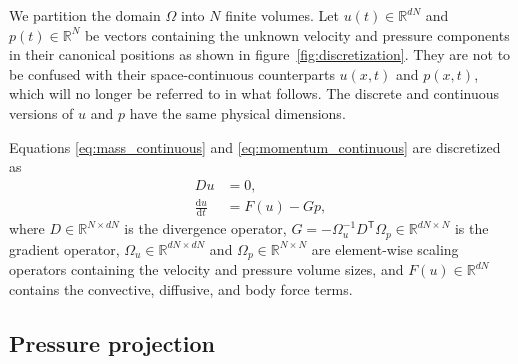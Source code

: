\documentclass[preprint]{elsarticle}
\begin{document}
We partition the domain $\Omega$ into $N$ finite volumes.
Let $u(t) \in \mathbb{R}^{d N}$ and $p(t) \in \mathbb{R}^N$ be vectors
containing the unknown velocity and pressure components in their canonical
positions as shown in figure~\ref{fig:discretization}. They are not to be
confused with their space-continuous counterparts $u(x, t)$ and $p(x, t)$, which
will no longer be referred to in what follows. The discrete and continuous
versions of $u$ and $p$ have the same physical dimensions.

Equations \eqref{eq:mass_continuous} and \eqref{eq:momentum_continuous} are
discretized as
\begin{align}
    D u & = 0, \label{eq:mass} \\
    \frac{\mathrm{d} u}{\mathrm{d} t} & = F(u) - G p, \label{eq:momentum}
\end{align}
where
$D \in \mathbb{R}^{N \times d N}$ is the divergence operator, $G =
-\Omega_u^{-1} D^\mathsf{T} \Omega_p \in \mathbb{R}^{d N \times N}$ is the
gradient operator, $\Omega_u \in \mathbb{R}^{d N \times d N}$ and $\Omega_p
\in \mathbb{R}^{N \times N}$ are element-wise scaling operators containing the
velocity and pressure volume sizes, and $F(u) \in \mathbb{R}^{d N}$ contains
the convective, diffusive, and body force terms.

\subsection{Pressure projection}
\end{document}
